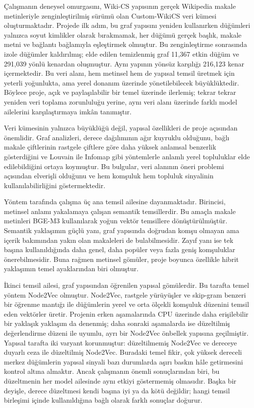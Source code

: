 Çalışmanın deneysel omurgasını, Wiki-CS yapısının gerçek Wikipedia makale
metinleriyle zenginleştirilmiş sürümü olan Custom-WikiCS veri kümesi
oluşturmaktadır. Projede ilk adım, bu graf yapısını yeniden kullanırken
düğümleri yalnızca soyut kimlikler olarak bırakmamak, her düğümü gerçek başlık,
makale metni ve bağlantı bağlamıyla eşleştirmek olmuştur. Bu zenginleştirme
sonrasında izole düğümler kaldırılmış; elde edilen temizlenmiş graf 11,367
etkin düğüm ve 291,039 yönlü kenardan oluşmuştur. Aynı yapının yönsüz
karşılığı 216,123 kenar içermektedir. Bu veri alanı, hem metinsel hem de
yapısal temsil üretmek için yeterli yoğunlukta, ama yerel donanım üzerinde
yönetilebilecek büyüklüktedir. Böylece proje, açık ve paylaşılabilir bir temel
üzerinde ilerlemiş; tekrar tekrar yeniden veri toplama zorunluluğu yerine,
aynı veri alanı üzerinde farklı model ailelerini karşılaştırmaya imkân
tanımıştır.

Veri kümesinin yalnızca büyüklüğü değil, yapısal özellikleri de proje
açısından önemlidir. Graf analizleri, derece dağılımının ağır kuyruklu
olduğunu, bağlı makale çiftlerinin rastgele çiftlere göre daha yüksek anlamsal
benzerlik gösterdiğini ve Louvain ile Infomap gibi yöntemlerle anlamlı yerel
topluluklar elde edilebildiğini ortaya koymuştur. Bu bulgular, veri alanının
öneri problemi açısından elverişli olduğunu ve hem komşuluk hem topluluk
sinyalinin kullanılabilirliğini göstermektedir.

Yöntem tarafında çalışma üç ana temsil ailesine dayanmaktadır. Birincisi,
metinsel anlamı yakalamaya çalışan semantik temsillerdir. Bu amaçla makale
metinleri BGE-M3 kullanılarak yoğun vektör temsillere dönüştürülmüştür.
Semantik yaklaşımın güçlü yanı, graf yapısında doğrudan komşu olmayan ama
içerik bakımından yakın olan makaleleri de bulabilmesidir. Zayıf yanı ise tek
başına kullanıldığında daha genel, daha popüler veya fazla geniş komşuluklar
önerebilmesidir. Buna rağmen metinsel gömüler, proje boyunca özellikle hibrit
yaklaşımın temel ayaklarından biri olmuştur.

İkinci temsil ailesi, graf yapısından öğrenilen yapısal gömülerdir. Bu
tarafta temel yöntem Node2Vec olmuştur. Node2Vec, rastgele yürüyüşler ve
skip-gram benzeri bir öğrenme mantığı ile düğümlerin yerel ve orta ölçekli
komşuluk düzenini temsil eden vektörler üretir. Projenin erken aşamalarında
CPU üzerinde daha erişilebilir bir yaklaşık yaklaşım da denenmiş; daha sonraki
aşamalarda ise düzeltilmiş değerlendirme düzeni ile uyumlu, ayrı bir Node2Vec
önbellek yapısına geçilmiştir. Yapısal tarafta iki varyant korunmuştur:
düzeltilmemiş Node2Vec ve dereceye duyarlı ceza ile düzeltilmiş Node2Vec.
Buradaki temel fikir, çok yüksek dereceli merkez düğümlerin yapısal sinyali
bazı durumlarda aşırı baskın hâle getirmesini kontrol altına almaktır. Ancak
çalışmanın önemli sonuçlarından biri, bu düzeltmenin her model ailesinde aynı
etkiyi göstermemiş olmasıdır. Başka bir deyişle, derece düzeltmesi kendi başına
iyi ya da kötü değildir; hangi temsil birleşimi içinde kullanıldığına bağlı
olarak farklı sonuçlar doğurur.

